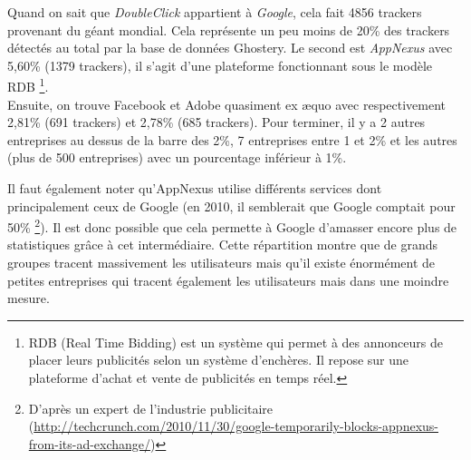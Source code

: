 Quand on sait que \textit{DoubleClick} appartient à \textit{Google}, cela fait 4856 trackers provenant du géant mondial. Cela représente un peu moins de 20\% des trackers détectés au total par la base de données Ghostery. Le second est \textit{AppNexus} avec 5,60\% (1379 trackers), il s'agit d'une plateforme fonctionnant sous le modèle RDB \footnote{RDB (Real Time Bidding) est un système qui permet à des annonceurs de placer leurs publicités selon un système d'enchères. Il repose sur une plateforme d'achat et vente de publicités en temps réel.}.
\\
Ensuite, on trouve Facebook et Adobe quasiment ex \ae{}quo avec respectivement 2,81\% (691 trackers) et 2,78\% (685 trackers). Pour terminer, il y a 2 autres entreprises au dessus de la barre des 2\%, 7 entreprises entre 1 et 2\% et les autres (plus de 500 entreprises) avec un pourcentage inférieur à 1\%.
\newline

Il faut également noter qu'AppNexus utilise différents services dont principalement ceux de Google (en 2010, il semblerait que Google comptait pour 50\% \footnote{D'après un expert de l'industrie publicitaire (\url{http://techcrunch.com/2010/11/30/google-temporarily-blocks-appnexus-from-its-ad-exchange/})}). Il est donc possible que cela permette à Google d'amasser encore plus de statistiques grâce à cet intermédiaire. Cette répartition montre que de grands groupes tracent massivement les utilisateurs mais qu'il existe énormément de petites entreprises qui tracent également les utilisateurs mais dans une moindre mesure. 
